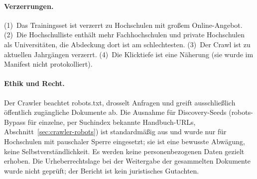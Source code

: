 \paragraph{Verzerrungen.} (1)~Das Trainingsset ist verzerrt zu Hochschulen mit großem Online-Angebot. (2)~Die Hochschulliste enthält mehr Fachhochschulen und private Hochschulen als Universitäten, die Abdeckung dort ist am schlechtesten. (3)~Der Crawl ist zu aktuellen Jahrgängen verzerrt. (4)~Die Klicktiefe ist eine Näherung (sie wurde im Manifest nicht protokolliert).

\paragraph{Ethik und Recht.} Der Crawler beachtet robots.txt, drosselt Anfragen und greift ausschließlich öffentlich zugängliche Dokumente ab. Die Ausnahme für Discovery-Seeds (robots-Bypass für einzelne, per Suchindex bekannte Handbuch-URLs, Abschnitt~\ref{sec:crawler-robots}) ist standardmäßig aus und wurde nur für Hochschulen mit pauschaler Sperre eingesetzt; sie ist eine bewusste Abwägung, keine Selbstverständlichkeit. Es werden keine personenbezogenen Daten gezielt erhoben. Die Urheberrechtslage bei der Weitergabe der gesammelten Dokumente wurde nicht geprüft; der Bericht ist kein juristisches Gutachten.
